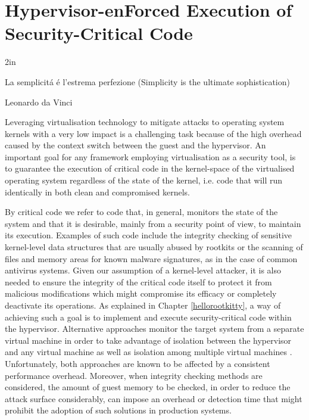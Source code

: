 \newcommand{\HRK}{\emph{Hello rootKitty}}

\chapter{Hypervisor-enForced Execution of Security-Critical Code}\label{hyperforce}

\epigraph{2in}{La semplicit\'a \'e l'estrema perfezione (Simplicity is the ultimate sophistication)}{Leonardo da Vinci}{}




Leveraging virtualisation technology to mitigate attacks to operating system kernels with a very low impact is a challenging task because of the high overhead caused by the context switch between the guest and the hypervisor. An important goal for any framework employing virtualisation as a security tool, is to guarantee the execution of critical code in the kernel-space of the virtualised operating system regardless of the state of the kernel, i.e. code that will run identically in both clean and compromised kernels.

By critical code we refer to code that, in general, monitors the state of the system and that it is desirable, mainly from a security point of view, to maintain its execution. Examples of such code include the integrity checking of sensitive kernel-level data structures that are usually abused by rootkits or the scanning of files and memory areas for known malware signatures, as in the case of common antivirus systems. 
Given our assumption of a kernel-level attacker, it is also needed to ensure the integrity of the critical code itself to protect it from malicious modifications which might compromise its efficacy or completely deactivate its operations.
As explained in Chapter \ref{hellorootkitty}, a way of achieving such a goal is to implement and execute security-critical code within the hypervisor. Alternative approaches monitor the target system from a separate virtual machine in order to take advantage of isolation between the hypervisor and any virtual machine as well as isolation among multiple virtual machines \cite{lares, outvm, livewire}.
Unfortunately, both approaches are known to be affected by a consistent performance overhead. Moreover, when integrity checking methods are considered, the amount of guest memory to be checked, in order to reduce the attack surface considerably, can impose an overhead or detection time that might prohibit the adoption of such solutions in production systems. 

